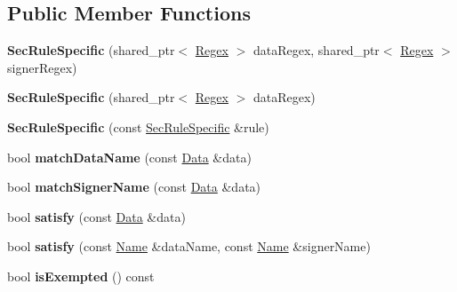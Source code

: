 \subsection*{Public Member Functions}
\begin{DoxyCompactItemize}
\item 
{\bfseries Sec\+Rule\+Specific} (shared\+\_\+ptr$<$ \hyperlink{classndn_1_1RegexTopMatcher}{Regex} $>$ data\+Regex, shared\+\_\+ptr$<$ \hyperlink{classndn_1_1RegexTopMatcher}{Regex} $>$ signer\+Regex)\hypertarget{classndn_1_1SecRuleSpecific_af8adb81e3b79de831a10c12d43adb4f9}{}\label{classndn_1_1SecRuleSpecific_af8adb81e3b79de831a10c12d43adb4f9}

\item 
{\bfseries Sec\+Rule\+Specific} (shared\+\_\+ptr$<$ \hyperlink{classndn_1_1RegexTopMatcher}{Regex} $>$ data\+Regex)\hypertarget{classndn_1_1SecRuleSpecific_af5675130a7e2b9830cbcdff1bcf46b31}{}\label{classndn_1_1SecRuleSpecific_af5675130a7e2b9830cbcdff1bcf46b31}

\item 
{\bfseries Sec\+Rule\+Specific} (const \hyperlink{classndn_1_1SecRuleSpecific}{Sec\+Rule\+Specific} \&rule)\hypertarget{classndn_1_1SecRuleSpecific_a960db07bcd41f26ba80a56c682826d8e}{}\label{classndn_1_1SecRuleSpecific_a960db07bcd41f26ba80a56c682826d8e}

\item 
bool {\bfseries match\+Data\+Name} (const \hyperlink{classndn_1_1Data}{Data} \&data)\hypertarget{classndn_1_1SecRuleSpecific_a183c2328561a8c043fa3af426a75ba10}{}\label{classndn_1_1SecRuleSpecific_a183c2328561a8c043fa3af426a75ba10}

\item 
bool {\bfseries match\+Signer\+Name} (const \hyperlink{classndn_1_1Data}{Data} \&data)\hypertarget{classndn_1_1SecRuleSpecific_a7d52a1e37795205a4b0d05259c795e7e}{}\label{classndn_1_1SecRuleSpecific_a7d52a1e37795205a4b0d05259c795e7e}

\item 
bool {\bfseries satisfy} (const \hyperlink{classndn_1_1Data}{Data} \&data)\hypertarget{classndn_1_1SecRuleSpecific_a388b433f9c5c998118479cc02a3133df}{}\label{classndn_1_1SecRuleSpecific_a388b433f9c5c998118479cc02a3133df}

\item 
bool {\bfseries satisfy} (const \hyperlink{classndn_1_1Name}{Name} \&data\+Name, const \hyperlink{classndn_1_1Name}{Name} \&signer\+Name)\hypertarget{classndn_1_1SecRuleSpecific_aca28128dd441c365627925c871713dbb}{}\label{classndn_1_1SecRuleSpecific_aca28128dd441c365627925c871713dbb}

\item 
bool {\bfseries is\+Exempted} () const\hypertarget{classndn_1_1SecRuleSpecific_a864c3d1d79bb7ce45d2b6f9bc182d97b}{}\label{classndn_1_1SecRuleSpecific_a864c3d1d79bb7ce45d2b6f9bc182d97b}

\end{DoxyCompactItemize}
